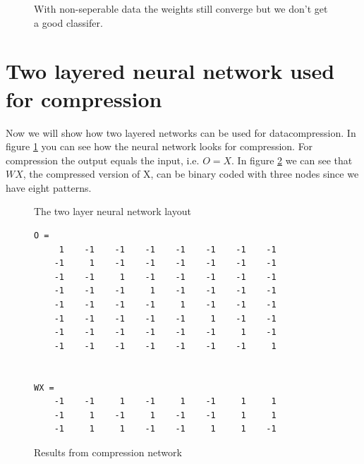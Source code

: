 \documentclass[a4paper,11pt]{article}
\begin{document}
\begin{figure}[h!]
\caption{With non-seperable data the weights still converge but we don't get a good classifer.}
\end{figure}

\clearpage
\section{Two layered neural network used for compression}
Now we will show how two layered networks can be used for datacompression. In figure \ref{fig:compress} you can see how the neural network looks for compression. For compression the output equals the input, i.e. $O=X$. In figure \ref{fig:compress2} we can see that $WX$, the compressed version of X, can be binary coded with three nodes since we have eight patterns.

\vspace{5cm}
\begin{figure}[h!]
\label{fig:compress}
\caption{The two layer neural network layout}
\end{figure}

\begin{figure}[h!]
\begin{lstlisting}
O =
     1    -1    -1    -1    -1    -1    -1    -1
    -1     1    -1    -1    -1    -1    -1    -1
    -1    -1     1    -1    -1    -1    -1    -1
    -1    -1    -1     1    -1    -1    -1    -1
    -1    -1    -1    -1     1    -1    -1    -1
    -1    -1    -1    -1    -1     1    -1    -1
    -1    -1    -1    -1    -1    -1     1    -1
    -1    -1    -1    -1    -1    -1    -1     1


WX =
    -1    -1     1    -1     1    -1     1     1
    -1     1    -1     1    -1    -1     1     1
    -1     1     1    -1    -1     1     1    -1
\end{lstlisting}
\label{fig:compress2}
\caption{Results from compression network}
\end{figure}
\end{document}
